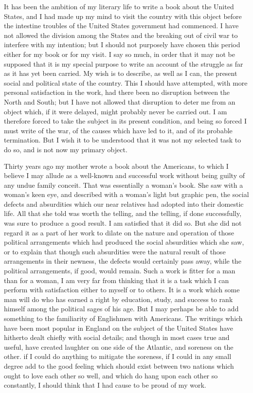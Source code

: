 It has been the ambition of my literary life to write a book about
the United States, and I had made up my mind to visit the country
with this object before the intestine troubles of the United States
government had commenced.  I have not allowed the division among
the States and the breaking out of civil war to interfere with my
intention; but I should not purposely have chosen this period
either for my book or for my visit.  I say so much, in order that
it may not be supposed that it is my special purpose to write an
account of the struggle as far as it has yet been carried.  My wish
is to describe, as well as I can, the present social and political
state of the country.  This I should have attempted, with more
personal satisfaction in the work, had there been no disruption
between the North and South; but I have not allowed that disruption
to deter me from an object which, if it were delayed, might
probably never be carried out.  I am therefore forced to take the
subject in its present condition, and being so forced I must write
of the war, of the causes which have led to it, and of its probable
termination.  But I wish it to be understood that it was not my
selected task to do so, and is not now my primary object.

Thirty years ago my mother wrote a book about the Americans, to
which I believe I may allude as a well-known and successful work
without being guilty of any undue family conceit.  That was
essentially a woman's book.  She saw with a woman's keen eye, and
described with a woman's light but graphic pen, the social defects
and absurdities which our near relatives had adopted into their
domestic life.  All that she told was worth the telling, and the
telling, if done successfully, was sure to produce a good result.
I am satisfied that it did so.  But she did not regard it as a part
of her work to dilate on the nature and operation of those
political arrangements which had produced the social absurdities
which she saw, or to explain that though such absurdities were the
natural result of those arrangements in their newness, the defects
would certainly pass away, while the political arrangements, if
good, would remain.  Such a work is fitter for a man than for a
woman, I am very far from thinking that it is a task which I can
perform with satisfaction either to myself or to others.  It is a
work which some man will do who has earned a right by education,
study, and success to rank himself among the political sages of his
age.  But I may perhaps be able to add something to the familiarity
of Englishmen with Americans.  The writings which have been most
popular in England on the subject of the United States have
hitherto dealt chiefly with social details; and though in most
cases true and useful, have created laughter on one side of the
Atlantic, and soreness on the other.  if I could do anything to
mitigate the soreness, if I could in any small degree add to the
good feeling which should exist between two nations which ought to
love each other so well, and which do hang upon each other so
constantly, I should think that I had cause to be proud of my work.

